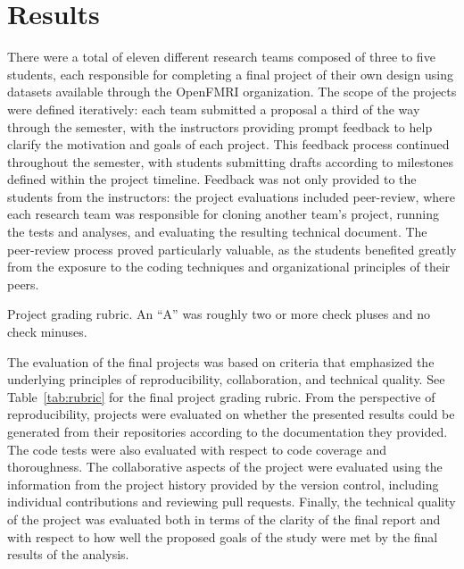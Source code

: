 \section{Results}\label{results}

There were a total of eleven different research teams composed of three
to five students, each responsible for completing a final project of their
own design using datasets available through the OpenFMRI organization.
The scope of the projects were defined iteratively: each team submitted a 
proposal a third of the way through the semester, with the instructors providing
prompt feedback to help clarify the motivation and goals of each project.
This feedback process continued throughout the semester, with students 
submitting drafts according to milestones defined within the project
timeline.
Feedback was not only provided to the students from the instructors: the
project evaluations included peer-review, where each research team was
responsible for cloning another team's project, running the tests and analyses,
and evaluating the resulting technical document.
The peer-review process proved particularly valuable, as the students 
benefited greatly from the exposure to the coding techniques and 
organizational principles of their peers.


\begin{table}
\centering
\begin{tiny}

\caption{Project grading rubric.
An ``A'' was roughly two or more check pluses and no check minuses.}
\label{tab:rubric}
\end{tiny}
\end{table}

The evaluation of the final projects was based on criteria that emphasized the
underlying principles of reproducibility, collaboration, and technical
quality.
See Table~\ref{tab:rubric} for the final project grading rubric.
From the perspective of reproducibility, projects were evaluated on whether the
presented results could be generated from their repositories according to the
documentation they provided.
The code tests were also evaluated with respect to code coverage
and thoroughness.
The collaborative aspects of the project were evaluated using the information
from the project history provided by the version control, including
individual contributions and reviewing pull requests.
Finally, the technical quality of the project was evaluated both in terms of
the clarity of the final report and with respect to how well the proposed
goals of the study were met by the final results of the analysis.

